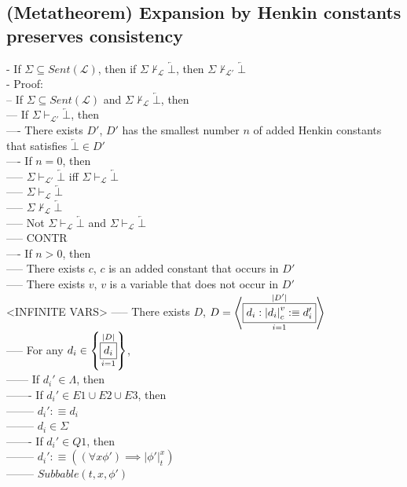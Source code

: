 \documentclass{book}
\newcommand{\is}{:\equiv}
\newcommand{\inot}{\not}
\newcommand{\contr}{\overleftarrow{\bot}}
\newcommand{\set}[1]{\left\{ #1 \right\}}
\newcommand{\seq}[1]{\left\langle #1 \right\rangle}
\newcommand{\vdc}[3]{\underset{#2}{\overset{#3}{\fbox{$#1$}}}}
\newcommand{\sub}[3]{\left|#1\right|_{#3}^{#2}}
\begin{document}
\subsection{(Metatheorem) Expansion by Henkin constants preserves consistency} %
	- If $\Sigma \subseteq Sent(\mathcal{L})$, then if $\Sigma \inot \vdash_{\mathcal{L}} \contr$, then $\Sigma \inot \vdash_{\mathcal{L}'} \contr$ \\ 
	- Proof: \\
		-- If $\Sigma \subseteq Sent(\mathcal{L})$ and $\Sigma \inot \vdash_{\mathcal{L}} \contr$, then \\
			--- If $\Sigma \vdash_{\mathcal{L}'} \contr$, then \\
				---- There exists $D'$, $D'$ has the smallest number $n$ of added Henkin constants that satisfies $\contr \in D'$ \\
				---- If $n = 0$, then \\
					----- $\Sigma \vdash_{\mathcal{L}'} \contr$ iff $\Sigma \vdash_{\mathcal{L}} \contr$ \\
					----- $\Sigma \vdash_{\mathcal{L}} \contr$ \\
					----- $\Sigma \inot \vdash_{\mathcal{L}} \contr$ \\
					----- Not $\Sigma \vdash_{\mathcal{L}} \contr$ and $\Sigma \vdash_{\mathcal{L}} \contr$ \\
					----- CONTR \\
				---- If $n > 0$, then \\
					----- There exists $c$, $c$ is an added constant that occurs in $D'$ \\
					----- There exists $v$, $v$ is a variable that does not occur in $D'$ \\ <INFINITE VARS>
					----- There exists $D$, $D = \seq{\vdc{d_i: \sub{d_i}{v}{c} \is d_i'}{i=1}{|D'|}}$ \\
					----- For any $d_i \in \set{\vdc{d_i}{i=1}{|D|}}$, \\
						------ If $d_i' \in \Lambda$, then \\
							------- If $d_i' \in E1 \cup E2 \cup E3$, then \\
								-------- $d_i' \is d_i$ \\
								-------- $d_i \in \Sigma$ \\
							------- If $d_i' \in Q1$, then \\
								-------- $d_i' \is ((\forall x \phi') \implies \sub{\phi'}{x}{t})$ \\ 
								-------- $Subbable(t, x, \phi')$ \\
\end{document}
